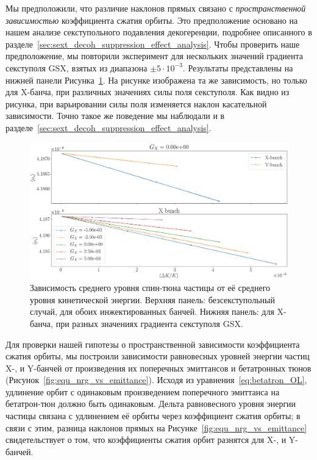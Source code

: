 Мы предположили, что различие наклонов прямых связано с \emph{пространственной зависимостью} коэффициента сжатия орбиты. Это предположение основано на нашем анализе секступольного подавления декогеренции, подробнее описанного в разделе~\ref{sec:sext_decoh_suppression_effect_analysis}. Чтобы проверить наше предположение, мы повторили эксперимент для нескольких значений градиента секступоля GSX, взятых из диапазона $\pm 5\cdot 10^{-3}$.  Результаты представлены на  нижней панели Рисунка~\ref{fig:stune_traj_equ_main}. На рисунке изображена та же зависимость, но только для X-банча, при различных значениях силы поля секступоля. Как видно из рисунка, при варьировании силы поля изменяется наклон касательной зависимости. Точно такое же поведение мы наблюдали и в разделе~\ref{sec:sext_decoh_suppression_effect_analysis}.

\begin{figure}[H]
	\centering
	\includegraphics[height=.3\paperheight]{images/stune_traj_equ/part1/stune_vs_equ_energy}
	\caption[Зависимость среднего уровня спин-тюна частицы от её среднего уровня кинетической энергии.]{Зависимость среднего уровня спин-тюна частицы от её среднего уровня кинетической энергии. Верхняя панель: безсекступольный случай, для обоих инжектированных банчей. Нижняя панель: для X-банча, при разных значениях градиента секступоля GSX.\label{fig:stune_traj_equ_main}}
\end{figure}

Для проверки нашей гипотезы о пространственной зависимости коэффициента сжатия орбиты, мы построили зависимости равновесных уровней энергии частиц X-, и Y-банчей от произведения их поперечных эмиттансов и бетатронных тюнов (Рисунок~\ref{fig:equ_nrg_vs_emittance}). Исходя из уравнения~\eqref{eq:betatron_OL}, удлинение орбит с одинаковым произведением поперечного эмиттанса на бетатрон-тюн должно быть одинаковым. Дельта равновесного уровня энергии частицы связана с удлинением её орбиты через коэффициент сжатия орбиты; в связи с этим, разница наклонов прямых на Рисунке~\ref{fig:equ_nrg_vs_emittance} свидетельствует о том, что коэффициенты сжатия орбит разнятся для X-, и Y-банчей. 

